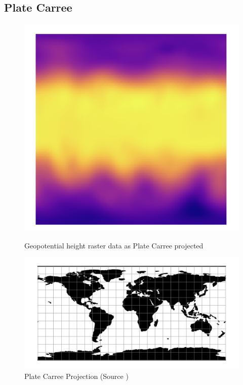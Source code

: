 \newpage

\subsection{Plate Carree}

\begin{figure}[H]
    \centering
    \begin{minipage}{0.30\textwidth}
        \centering
        \includegraphics[width=0.9\linewidth]{figures/chapter-8/plate_caree_geopoth_raster.png}
        \caption{ Geopotential height raster data as Plate Carree projected}
        \label{fig:eqc_geopoth_raster}
    \end{minipage}\hfill
    \begin{minipage}{0.30\textwidth}
        \centering
        \includegraphics[width=0.9\linewidth]{figures/chapter-8/eqc.png}
        \caption{Plate Carree Projection (Source \cite{PROJ_SITE})}

\end{minipage}
\end{figure}
